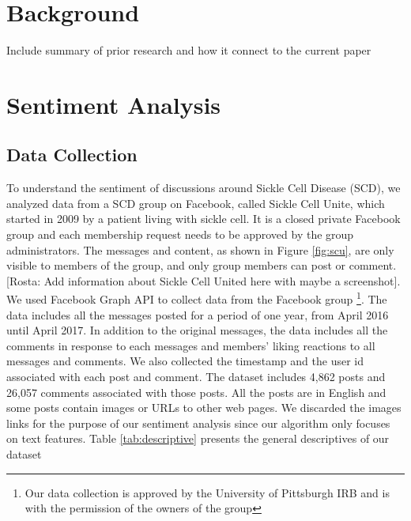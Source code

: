 \documentclass{llncs}
\newcommand{\rosta}[1]{\textcolor{BlueGreen}{[Rosta: #1]}}
\begin{document}
\section{Background}
Include summary of prior research and how it connect to the current paper

\section{Sentiment Analysis}


\subsection{Data Collection}

To understand the sentiment of discussions around Sickle Cell Disease (SCD), we analyzed data from a SCD group on Facebook, called Sickle Cell Unite, which started in 2009 by a patient living with sickle cell. It is a closed private Facebook group and each membership request needs to be approved by the group administrators. The messages and content, as shown in Figure \ref{fig:scu}, are only visible to members of the group, and only group members can post or comment.\cite{Farzan2017} \rosta{Add information about Sickle Cell United here with maybe a screenshot}. We used Facebook Graph API to collect data from the Facebook group \footnote{Our data collection is approved by the University of Pittsburgh IRB and is with the permission of the owners of the group}. The data includes all the messages posted for a period of one year, from April 2016 until April 2017. In addition to the original messages, the data includes all the comments in response to each messages and members' liking reactions  to all messages and comments. We also collected the timestamp and the user id associated with each post and comment. The dataset includes 4,862 posts and 26,057 comments associated with those posts. All the posts are in English and some posts contain images or URLs to other web pages. We discarded the images links for the purpose of our sentiment analysis since our algorithm only focuses on text features. Table \ref{tab:descriptive} presents the general descriptives of our dataset
\end{document}

